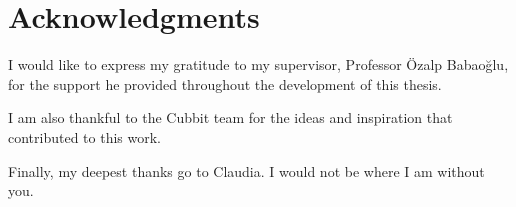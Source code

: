 \shipout\null
\chapter*{Acknowledgments}

I would like to express my gratitude to my supervisor, Professor Özalp Babaoğlu, for the support he provided throughout the development of this thesis.

I am also thankful to the Cubbit team for the ideas and inspiration that contributed to this work.

Finally, my deepest thanks go to Claudia. I would not be where I am without you.
